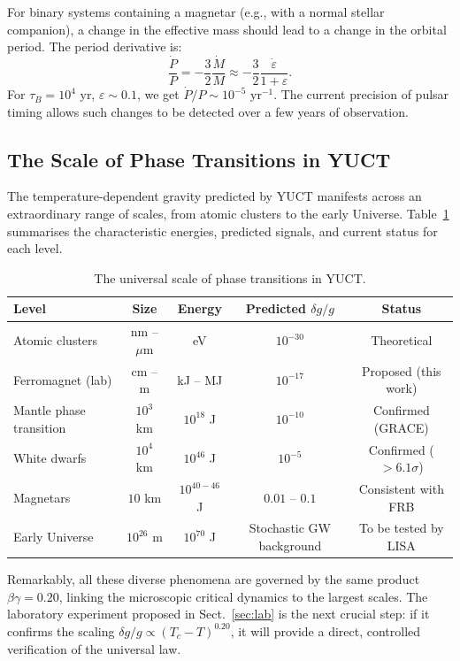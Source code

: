 \documentclass[12pt]{article}
\theoremstyle{remark}
\newcommand{\eps}{\varepsilon}
\begin{document}
	For binary systems containing a magnetar (e.g., with a normal stellar companion), a change in the effective mass should lead to a change in the orbital period. The period derivative is:
	\begin{equation}
		\frac{\dot{P}}{P} = -\frac{3}{2} \frac{\dot{M}}{M} \approx -\frac{3}{2} \frac{\dot{\eps}}{1+\eps}.
		\label{eq:pdot}
	\end{equation}
	For $\tau_B = 10^4$ yr, $\eps \sim 0.1$, we get $\dot{P}/P \sim 10^{-5}$ yr$^{-1}$. The current precision of pulsar timing allows such changes to be detected over a few years of observation.
	
	\subsection{The Scale of Phase Transitions in YUCT}
	\label{subsec:scale}
	
	The temperature-dependent gravity predicted by YUCT manifests across an extraordinary range of scales, from atomic clusters to the early Universe. Table~\ref{tab:scale} summarises the characteristic energies, predicted signals, and current status for each level.
	
	\begin{table}[htbp]
		\centering
		\caption{The universal scale of phase transitions in YUCT.}
		\label{tab:scale}
		\small
		\begin{tabular}{lcccc}
			\toprule
			\textbf{Level} & \textbf{Size} & \textbf{Energy} & \textbf{Predicted } \(\delta g/g\) & \textbf{Status} \\
			\midrule
			Atomic clusters & nm – $\mu$m & eV & $10^{-30}$ & Theoretical \\
			Ferromagnet (lab) & cm – m & kJ – MJ & $10^{-17}$ & Proposed (this work) \\
			Mantle phase transition & $10^3$ km & $10^{18}$ J & $10^{-10}$ & Confirmed (GRACE) \\
			White dwarfs & $10^4$ km & $10^{46}$ J & $10^{-5}$ & Confirmed ($>6.1\sigma$) \\
			Magnetars & $10$ km & $10^{40-46}$ J & $0.01$ – $0.1$ & Consistent with FRB \\
			Early Universe & $10^{26}$ m & $10^{70}$ J & Stochastic GW background & To be tested by LISA \\
			\bottomrule
		\end{tabular}
	\end{table}
	
	Remarkably, all these diverse phenomena are governed by the same product $\beta\gamma = 0.20$, linking the microscopic critical dynamics to the largest scales. The laboratory experiment proposed in Sect.~\ref{sec:lab} is the next crucial step: if it confirms the scaling $\delta g/g \propto (T_c - T)^{0.20}$, it will provide a direct, controlled verification of the universal law.
	
\end{document}
